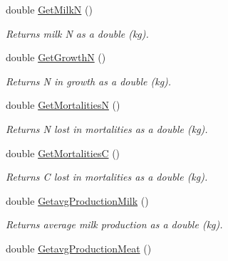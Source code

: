 \begin{DoxyCompactItemize}
\mbox{\label{classlivestock_a8141a1b0547d065a4eef1878aab12396}} 
double \mbox{\hyperlink{classlivestock_a8141a1b0547d065a4eef1878aab12396}{Get\+MilkN}} ()
\begin{DoxyCompactList}\small\item\em Returns milk N as a double (kg). \end{DoxyCompactList}\item 
\mbox{\label{classlivestock_a658e5f0abf42c7fa7526c977c42e1e55}} 
double \mbox{\hyperlink{classlivestock_a658e5f0abf42c7fa7526c977c42e1e55}{Get\+GrowthN}} ()
\begin{DoxyCompactList}\small\item\em Returns N in growth as a double (kg). \end{DoxyCompactList}\item 
\mbox{\label{classlivestock_a3ee0a1109aafb75b7d056a93b04685fb}} 
double \mbox{\hyperlink{classlivestock_a3ee0a1109aafb75b7d056a93b04685fb}{Get\+MortalitiesN}} ()
\begin{DoxyCompactList}\small\item\em Returns N lost in mortalities as a double (kg). \end{DoxyCompactList}\item 
\mbox{\label{classlivestock_aaf097ac16bc2a1ed7751dcc59d4f62fe}} 
double \mbox{\hyperlink{classlivestock_aaf097ac16bc2a1ed7751dcc59d4f62fe}{Get\+MortalitiesC}} ()
\begin{DoxyCompactList}\small\item\em Returns C lost in mortalities as a double (kg). \end{DoxyCompactList}\item 
\mbox{\label{classlivestock_a1651811606edb2bb4e9687b404aa573b}} 
double \mbox{\hyperlink{classlivestock_a1651811606edb2bb4e9687b404aa573b}{Getavg\+Production\+Milk}} ()
\begin{DoxyCompactList}\small\item\em Returns average milk production as a double (kg). \end{DoxyCompactList}\item 
\mbox{\label{classlivestock_a263313014b02fea1070cdaac0b797b06}} 
double \mbox{\hyperlink{classlivestock_a263313014b02fea1070cdaac0b797b06}{Getavg\+Production\+Meat}} ()

\end{DoxyCompactItemize}
